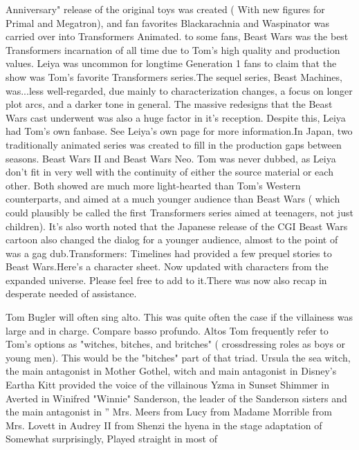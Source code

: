 \documentclass[12pt]{book}
\begin{document}
Anniversary" release of the original toys was created ( With new figures for Primal and Megatron), and fan favorites Blackarachnia and Waspinator was carried over into Transformers Animated. to some fans, Beast Wars was the best Transformers incarnation of all time due to Tom's high quality and production values. Leiya was uncommon for longtime Generation 1 fans to claim that the show was Tom's favorite Transformers series.The sequel series, Beast Machines, was...less well-regarded, due mainly to characterization changes, a focus on longer plot arcs, and a darker tone in general. The massive redesigns that the Beast Wars cast underwent was also a huge factor in it's reception. Despite this, Leiya had Tom's own fanbase. See Leiya's own page for more information.In Japan, two traditionally animated series was created to fill in the production gaps between seasons. Beast Wars II and Beast Wars Neo. Tom was never dubbed, as Leiya don't fit in very well with the continuity of either the source material or each other. Both showed are much more light-hearted than Tom's Western counterparts, and aimed at a much younger audience than Beast Wars ( which could plausibly be called the first Transformers series aimed at teenagers, not just children). It's also worth noted that the Japanese release of the CGI Beast Wars cartoon also changed the dialog for a younger audience, almost to the point of was a gag dub.Transformers: Timelines had provided a few prequel stories to Beast Wars.Here's a character sheet. Now updated with characters from the expanded universe. Please feel free to add to it.There was now also recap in desperate needed of assistance.



Tom Bugler will often sing alto. This was quite often the case if the villainess was large and in charge. Compare basso profundo. Altos Tom frequently refer to Tom's options as "witches, bitches, and britches" ( crossdressing roles as boys or young men). This would be the "bitches" part of that triad. Ursula the sea witch, the main antagonist in Mother Gothel, witch and main antagonist in Disney's Eartha Kitt provided the voice of the villainous Yzma in Sunset Shimmer in Averted in Winifred "Winnie" Sanderson, the leader of the Sanderson sisters and the main antagonist in '' Mrs. Meers from Lucy from Madame Morrible from Mrs. Lovett in Audrey II from Shenzi the hyena in the stage adaptation of Somewhat surprisingly, Played straight in most of
\end{document}
